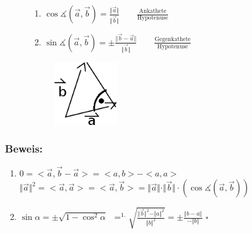 \begin{figure}[htbp]
	\begin{minipage}[t]{0.4\textwidth} 
	\begin{enumerate}
	\item $\cos \measuredangle(\vec{a},\vec{b})=\frac{\Vert\vec{a}\Vert}
	{\Vert\vec{b}\Vert} \qquad \frac{\textrm{Ankathete}}{\textrm{Hypotenuse}}$
	\item $\sin\measuredangle(\vec{a},\vec{b})=\pm\frac{\Vert\vec{b}-\vec{a}\Vert}
	{\Vert\vec{b}\Vert} \qquad \frac{\textrm{Gegenkathete}}{\textrm{Hypotenuse}}$
	\end{enumerate}
	\end{minipage}
	\begin{minipage}[b]{0.4\textwidth}
	\begin{figure}[H]
	\centering 
	\includegraphics[width=0.3\textwidth]{mainmatter/chapter1/pics/trigo3.png}
	\end{figure}
	\end{minipage}
\end{figure}
%
\subsubsection{Beweis:}
\begin{enumerate}
	\item $0=<\vec{a},\vec{b}-\vec{a}>=<a,b>-<a,a>$\\
	$\Vert\vec{a}\Vert^{2}=<\vec{a},\vec{a}>=<\vec{a},\vec{b}>=
	\Vert\vec{a}\Vert\cdot\Vert\vec{b}\Vert\cdot(\cos\measuredangle(\vec{a},
	\vec{b}))$
	\item $\sin\alpha=\pm\sqrt{1-\cos^{2}\alpha}$\
		$\mathop{=}^{\text{1.}}\sqrt{\frac{\Vert\vec{b}\Vert^{2}-\Vert a \Vert^{2}}
		{\Vert b \Vert^{2}}} =\pm \frac{\Vert b-a\Vert}{-\Vert b \Vert}$ \qquad 	
		$\square$
\end{enumerate}
